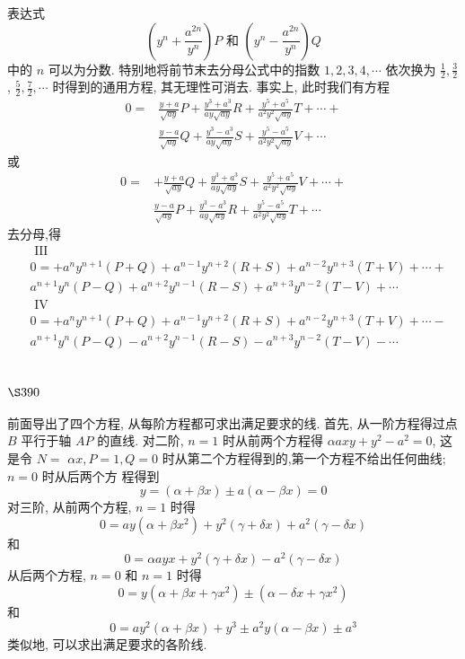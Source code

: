 表达式
\[
\left(y^{n}+\frac{a^{2 n}}{y^{n}}\right) P \text { 和 }\left(y^{n}-\frac{a^{2 n}}{y^{n}}\right) Q
\]
中的 $n$ 可以为分数. 特别地将前节末去分母公式中的指数 $1,2,3,4, \cdots$ 依次换为 $\frac{1}{2}, \frac{3}{2}$, $\frac{5}{2}, \frac{7}{2}, \cdots$ 时得到的通用方程, 其无理性可消去. 事实上, 此时我们有方程
\[
\begin{aligned}
0= & \frac{y+a}{\sqrt{a y}} P+\frac{y^{3}+a^{3}}{a y \sqrt{a y}} R+\frac{y^{5}+a^{5}}{a^{2} y^{2} \sqrt{a y}} T+\cdots+ \\
& \frac{y-a}{\sqrt{a y}} Q+\frac{y^{3}-a^{3}}{a y \sqrt{a y}} S+\frac{y^{5}-a^{5}}{a^{2} y^{2} \sqrt{a y}} V+\cdots
\end{aligned}
\]
或
\[
\begin{aligned}
0= & +\frac{y+a}{\sqrt{a y}} Q+\frac{y^{3}+a^{3}}{a y \sqrt{a y}} S+\frac{y^{5}+a^{5}}{a^{2} y^{2} \sqrt{a y}} V+\cdots+ \\
& \frac{y-a}{\sqrt{a y}} P+\frac{y^{3}-a^{3}}{a y \sqrt{a y}} R+\frac{y^{5}-a^{5}}{a^{2} y^{2} \sqrt{a y}} T+\cdots
\end{aligned}
\]
去分母,得 
\[
\begin{aligned}
& \text { III } \\
& 0=+a^{n} y^{n+1}(P+Q)+a^{n-1} y^{n+2}(R+S)+a^{n-2} y^{n+3}(T+V)+\cdots+ \\
& a^{n+1} y^{n}(P-Q)+a^{n+2} y^{n-1}(R-S)+a^{n+3} y^{n-2}(T-V)+\cdots \\
& \text { IV } \\
& 0=+a^{n} y^{n+1}(P+Q)+a^{n-1} y^{n+2}(R+S)+a^{n-2} y^{n+3}(T+V)+\cdots- \\
& a^{n+1} y^{n}(P-Q)-a^{n+2} y^{n-1}(R-S)-a^{n+3} y^{n-2}(T-V)-\cdots
\end{aligned}
\]
\section{$\S 390$}

前面导出了四个方程, 从每阶方程都可求出满足要求的线. 首先, 从一阶方程得过点 $B$ 平行于轴 $A P$ 的直线. 对二阶, $n=1$ 时从前两个方程得 $\alpha a x y+y^{2}-a^{2}=0$, 这是令 $N=$ $\alpha x, P=1, Q=0$ 时从第二个方程得到的,第一个方程不给出任何曲线; $n=0$ 时从后两个方 程得到
\[
y=(\alpha+\beta x) \pm a(\alpha-\beta x)=0
\]
对三阶, 从前两个方程, $n=1$ 时得
\[
0=a y\left(\alpha+\beta x^{2}\right)+y^{2}(\gamma+\delta x)+a^{2}(\gamma-\delta x)
\]
和
\[
0=\alpha a y x+y^{2}(\gamma+\delta x)-a^{2}(\gamma-\delta x)
\]
从后两个方程, $n=0$ 和 $n=1$ 时得
\[
0=y\left(\alpha+\beta x+\gamma x^{2}\right) \pm\left(\alpha-\delta x+\gamma x^{2}\right)
\]
和
\[
0=a y^{2}(\alpha+\beta x)+y^{3} \pm a^{2} y(\alpha-\beta x) \pm a^{3}
\]
类似地, 可以求出满足要求的各阶线.

